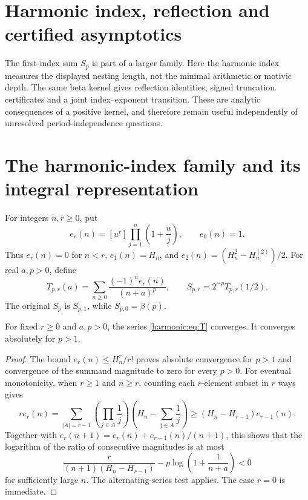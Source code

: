 

\section{Harmonic index, reflection and certified asymptotics}
The first-index sum $S_p$ is part of a larger family. Here the harmonic
index measures the displayed nesting length, not the minimal arithmetic
or motivic depth. The same beta kernel gives reflection identities,
signed truncation certificates and a joint index--exponent transition.
These are analytic consequences of a positive kernel, and therefore
remain useful independently of unresolved period-independence questions.

\section{The harmonic-index family and its integral representation}
\label{harmonic:sec:family}

\begin{definition}
For integers $n,r\ge0$, put
\begin{equation}\label{harmonic:eq:e}
 e_r(n)=[u^r]\prod_{j=1}^n\left(1+\frac uj\right),
 \qquad e_0(n)=1.
\end{equation}
Thus $e_r(n)=0$ for $n<r$, $e_1(n)=H_n$, and
$e_2(n)=(H_n^2-H_n^{(2)})/2$. For real $a,p>0$, define
\begin{equation}\label{harmonic:eq:T}
 T_{p,r}(a)=\sum_{n\ge0}\frac{(-1)^n e_r(n)}{(n+a)^p},
 \qquad S_{p,r}=2^{-p}T_{p,r}(1/2).
\end{equation}
The original $S_p$ is $S_{p,1}$, while $S_{p,0}=\beta(p)$.
\end{definition}

\begin{lemma}[Convergence]\label{harmonic:lem:conv}
For fixed $r\ge0$ and $a,p>0$, the series \eqref{harmonic:eq:T} converges. It converges absolutely for $p>1$.
\end{lemma}
\begin{proof}
The bound $e_r(n)\le H_n^r/r!$ proves absolute convergence for $p>1$ and convergence of the summand magnitude to zero for every $p>0$. For eventual monotonicity, when $r\ge1$ and $n\ge r$, counting each $r$-element subset in $r$ ways gives
\[
 r e_r(n)=\sum_{|A|=r-1}\left(\prod_{j\in A}\frac1j\right)
              \left(H_n-\sum_{j\in A}\frac1j\right)
 \ge (H_n-H_{r-1})e_{r-1}(n).
\]
Together with $e_r(n+1)=e_r(n)+e_{r-1}(n)/(n+1)$, this shows that the logarithm of the ratio of consecutive magnitudes is at most
\[
 \frac{r}{(n+1)(H_n-H_{r-1})}
 -p\log\left(1+\frac1{n+a}\right)<0
\]
for sufficiently large $n$. The alternating-series test applies. The case $r=0$ is immediate.
\end{proof}

